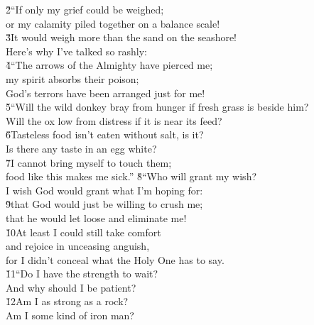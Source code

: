 \begin{poetry}
\poeml \v{2}``If only my grief could be weighed; \\
\poemll    or my calamity piled together on a balance scale! \\
\poeml \v{3}It would weigh more than the sand on the seashore! \\
\poemll    Here's why I've talked so rashly: \\
\poeml \v{4}``The arrows of the Almighty have pierced me; \\
\poemll    my spirit absorbs their poison; \\
\poemlll       God's terrors have been arranged just for me! \\
\poeml \v{5}``Will the wild donkey bray from hunger if fresh grass is beside him? \\
\poemll    Will the ox low from distress if it is near its feed? \\
\poeml \v{6}Tasteless food isn't eaten without salt, is it? \\
\poemll    Is there any taste in an egg white? \\
\poeml \v{7}I cannot bring myself to touch them; \\
\poemll    food like this makes me sick.''
\poeml \v{8}``Who will grant my wish? \\
\poemll    I wish God would grant what I'm hoping for: \\
\poeml \v{9}that God would just be willing to crush me; \\
\poemll    that he would let loose and eliminate me! \\
\poeml \v{10}At least I could still take comfort \\
\poemll    and rejoice in unceasing anguish, \\
\poemlll       for I didn't conceal what the Holy One has to say. \\
\poeml \v{11}``Do I have the strength to wait? \\
\poemll    And why should I be patient? \\
\poeml \v{12}Am I as strong as a rock? \\
\poemll    Am I some kind of iron man? \\

\end{poetry}
